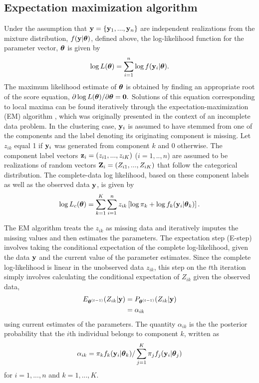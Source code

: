 \subsection{Expectation maximization algorithm}\label{subsec:em}
Under the assumption that $\mathbf y = \{\mathbf y_{1},...,\mathbf y_{n}\}$ are independent realizations from the mixture distribution, $f(\mathbf y | \boldsymbol\theta)$, defined above, the log-likelihood function for the parameter vector, $\boldsymbol \theta$ is given by
$$\log L(\boldsymbol\theta)=\sum^{n}_{i=1}\log f(\mathbf y_{i}|\boldsymbol \theta).$$
The maximum likelihood estimate of $\boldsymbol\theta$ is obtained by finding an appropriate root of the score equation, $\partial \log L(\boldsymbol\theta)/\partial \boldsymbol\theta=\mathbf 0.$ Solutions of this equation corresponding to local maxima can be found iteratively through the expectation-maximization (EM) algorithm \cite{dempster1977}, which was originally presented in the context of an incomplete data problem. In the clustering case, $\mathbf y_{i}$ is assumed to have stemmed from one of the components and the label denoting its originating component is missing. Let $z_{ik}$ equal 1 if $\mathbf y_{i}$ was generated from component $k$ and 0 otherwise. The component label vectors $\mathbf z_{i}=(z_{i1},...,z_{iK})$ ($i=1,..,n$) are assumed to be realizations of random vectors $\mathbf Z_{i}=(Z_{i1},...,Z_{iK})$ that follow the categorical distribution. The complete-data log likelihood, based on these component labels as well as the observed data $\mathbf y$, is given by
$$\log L_{c}(\boldsymbol \theta) =  \sum^{K}_{k=1}\sum^{n}_{i=1}z_{ik}\left[\log \pi_{k}+\log f_{k}(\mathbf y_{i}|\boldsymbol\theta_k)\right].$$

The EM algorithm treats the $z_{ik}$ as missing data and iteratively imputes the missing values and then  estimates the parameters. The expectation step (E-step) involves taking the conditional expectation of the complete log-likelihood, given the data $\mathbf y$ and the current value of the parameter estimates. Since the complete log-likelihood is linear in the unobserved data $z_{ik}$, this step on the $t$th iteration simply involves calculating the conditional expectation of $Z_{ik}$ given the observed data,
\begin{align*}
E_{\boldsymbol\theta^{(t-1)}}( Z_{ik}|\mathbf y) &= P_{\boldsymbol\theta^{(t-1)}}( Z_{ik}|\mathbf y)\\
&=\alpha_{ik}
\end{align*}
using current estimates of the parameters. The quantity $\alpha_{ik}$ is the the posterior probability that the $i$th individual belongs to component $k$, written as
$$\alpha_{ik}=\pi_{k}f_{k}(\mathbf y_{i}|\boldsymbol\theta_{k})/\sum_{j=1}^{K}\pi_{j}f_{j}(\mathbf y_{i}|\boldsymbol \theta_{j})$$
for $i=1,...,n$ and $k=1,...,K$.

